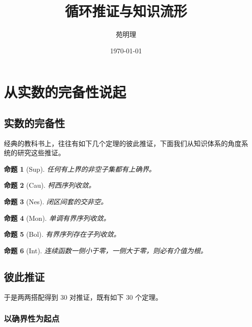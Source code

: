 \documentclass[a4paper,12pt]{article}
\title{循环推证与知识流形}
\author{苑明理}
\date{\monthyeardate\today}
\newtheorem{proposition}{命题}
\begin{document}
\begingroup
\let\newpage\relax
\maketitle
\endgroup

\renewcommand\contentsname{目录}
\setcounter{tocdepth}{2}
\tableofcontents

\newpage

\section{从实数的完备性说起}

\subsection{实数的完备性}

经典的教科书上，往往有如下几个定理的彼此推证，下面我们从知识体系的角度系统的研究这些推证。

\begin{proposition}[Sup]
  任何有上界的非空子集都有上确界。
\end{proposition}

\begin{proposition}[Cau]
  柯西序列收敛。
\end{proposition}

\begin{proposition}[Nes]
  闭区间套的交非空。
\end{proposition}

\begin{proposition}[Mon]
  单调有界序列收敛。
\end{proposition}

\begin{proposition}[Bol]
  有界序列存在子列收敛。
\end{proposition}

\begin{proposition}[Int]
  连续函数一侧小于零，一侧大于零，则必有介值为根。
\end{proposition}

\subsection{彼此推证}

于是两两搭配得到 30 对推证，既有如下 30 个定理。

\subsubsection{以确界性为起点}
\end{document}
